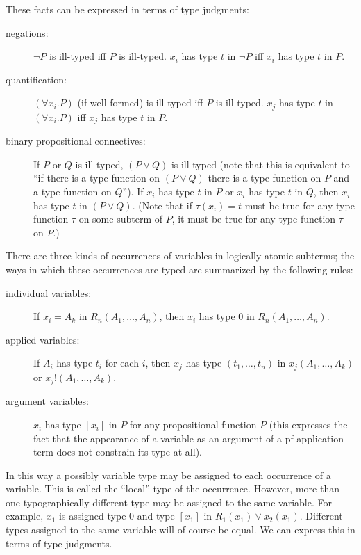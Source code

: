 \documentclass{article}
\begin{document}
These facts can be expressed in terms of type judgments:

\begin{description}

\item[negations:]  $\neg P$ is ill-typed iff $P$ is ill-typed.  $x_i$ has
type $t$ in $\neg P$ iff $x_i$ has type $t$ in $P$.

\item[quantification:] $(\forall x_i.P)$ (if well-formed) is ill-typed iff $P$
is ill-typed.  $x_j$ has type $t$ in $(\forall x_i.P)$ iff $x_j$ has type $t$
in $P$.

\item[binary propositional connectives:] If $P$ or $Q$ is ill-typed,
$(P \vee Q)$ is ill-typed (note that this is equivalent to ``if there
is a type function on $(P \vee Q)$ there is a type function on $P$ and
a type function on $Q$'').  If $x_i$ has type $t$ in $P$ or $x_i$ has
type $t$ in $Q$, then $x_i$ has type $t$ in $(P \vee Q)$.  (Note that
if $\tau(x_i) = t$ must be true for any type function $\tau$ on some
subterm of $P$, it must be true for any type function $\tau$ on $P$.)

\end{description}

There are three kinds of occurrences of variables in logically atomic
subterms; the ways in which these occurrences are typed are summarized
by the following rules:

\begin{description}

\item[individual variables:]  If $x_i = A_k$ in $R_n(A_1,\ldots,A_n)$, then $x_i$
has type 0 in $R_n(A_1,\ldots,A_n)$.

\item[applied variables:]  If $A_i$ has type $t_i$ for each $i$, then $x_j$ has
type $(t_1,\ldots,t_n)$ in $x_j(A_1,\ldots,A_k)$ or $x_j!(A_1,\ldots,A_k)$.

\item[argument variables:] $x_i$ has type $[x_i]$ in $P$ for any
propositional function $P$ (this expresses the fact that the
appearance of a variable as an argument of a pf application term does
not constrain its type at all).

\end{description}

In this way a possibly variable type may be assigned to each
occurrence of a variable.  This is called the ``local'' type of the
occurrence.  However, more than one typographically different type may
be assigned to the same variable.  For example, $x_1$ is assigned type
0 and type $[x_1]$ in $R_1(x_1) \vee x_2(x_1)$.  Different types
assigned to the same variable will of course be equal.  We can express
this in terms of type judgments.
\end{document}
